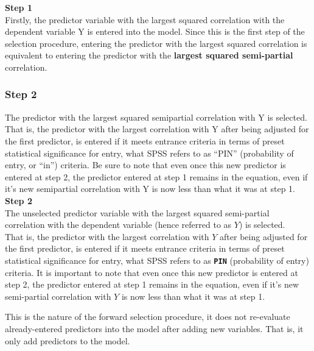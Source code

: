 \documentclass[a4paper,12pt]{article}
\begin{document}
\textbf{Step 1}\\
Firstly, the predictor variable with the largest squared correlation with the dependent variable Y is entered into the model. Since this is the first step of the selection procedure, entering the predictor with the largest squared correlation is equivalent to entering the predictor with the \textbf{largest squared semi-partial} correlation. 





\subsubsection*{Step 2}
The predictor with the largest squared semipartial correlation with Y is selected. That is, the predictor with the largest correlation with Y after being adjusted for the first predictor, is entered if it meets entrance criteria in terms of preset statistical significance for entry, what SPSS refers to as “PIN” (probability of entry, or “in”) criteria. Be sure to note that even once this new predictor is entered at step 2, the predictor entered at step 1 remains in the equation, even if it’s new semipartial correlation with Y is now less than what it was at step 1. 
\\
\textbf{Step 2}\\
The unselected predictor variable with the largest squared semi-partial correlation with the dependent variable (hence referred to as $Y$) is selected. 
\\
That is, the predictor with the largest correlation with $Y$ after being adjusted for the first predictor, is entered if it meets entrance criteria in terms of preset statistical significance for entry, what SPSS refers to as
\textbf{\texttt{PIN}} (probability of entry) criteria. 
It is important to note that even once this new predictor is entered at step 2, the predictor entered at step 1 remains in the equation, even if it's new semi-partial correlation with $Y$ is now less than what it was at step 1. 

This is the nature of the forward selection procedure, it does not re-evaluate already-entered predictors into the model after adding new variables. That is, it only add predictors to the model. 

\end{document}
